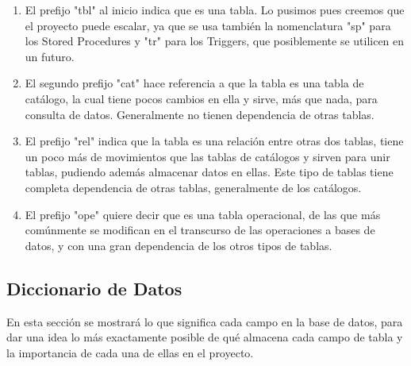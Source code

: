     \begin{enumerate}
        \item El prefijo "tbl" al inicio indica que es una tabla. Lo pusimos pues creemos que el proyecto puede escalar, ya que se usa también la nomenclatura "sp" para los Stored Procedures y "tr" para los Triggers, que posiblemente se utilicen en un futuro.
        \item El segundo prefijo "cat" hace referencia a que la tabla es una tabla de catálogo, la cual tiene pocos cambios en ella y sirve, más que nada, para consulta de datos. Generalmente no tienen dependencia de otras tablas.
        \item El prefijo "rel" indica que la tabla es una relación entre otras dos tablas, tiene un poco más de movimientos que las tablas de catálogos y sirven para unir tablas, pudiendo además almacenar datos en ellas. Este tipo de tablas tiene completa dependencia de otras tablas, generalmente de los catálogos.
        \item El prefijo "ope" quiere decir que es una tabla operacional, de las que más comúnmente se modifican en el transcurso de las operaciones a bases de datos, y con una gran dependencia de los otros tipos de tablas.
    \end{enumerate}


\subsection{Diccionario de Datos}
    En esta sección se mostrará lo que significa cada campo en la base de datos, para dar una idea lo más exactamente posible de qué almacena cada campo de tabla y la importancia de cada una de ellas en el proyecto.

